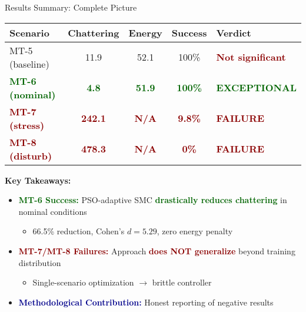 \documentclass[10pt,aspectratio=169]{beamer}
\newcommand{\highlight}[1]{\textcolor{darkblue}{\textbf{#1}}}
\newcommand{\emphred}[1]{\textcolor{darkred}{\textbf{#1}}}
\newcommand{\emphgreen}[1]{\textcolor{darkgreen}{\textbf{#1}}}
\begin{document}
\begin{frame}{Results Summary: Complete Picture}
\begin{table}
\centering
\small
\begin{tabular}{lcccl}
\toprule
\textbf{Scenario} & \textbf{Chattering} & \textbf{Energy} & \textbf{Success} & \textbf{Verdict} \\
\midrule
MT-5 (baseline) & 11.9 & 52.1 & 100\% & \emphred{Not significant} \\
\emphgreen{MT-6 (nominal)} & \emphgreen{4.8} & \emphgreen{51.9} & \emphgreen{100\%} & \emphgreen{EXCEPTIONAL} \\
\emphred{MT-7 (stress)} & \emphred{242.1} & \emphred{N/A} & \emphred{9.8\%} & \emphred{FAILURE} \\
\emphred{MT-8 (disturb)} & \emphred{478.3} & \emphred{N/A} & \emphred{0\%} & \emphred{FAILURE} \\
\bottomrule
\end{tabular}
\end{table}

\vspace{0.5cm}
\textbf{Key Takeaways:}
\begin{itemize}
    \item \emphgreen{MT-6 Success:} PSO-adaptive SMC \emphgreen{drastically reduces chattering} in nominal conditions
    \begin{itemize}
        \item 66.5\% reduction, Cohen's $d = 5.29$, zero energy penalty
    \end{itemize}
    \item \emphred{MT-7/MT-8 Failures:} Approach \emphred{does NOT generalize} beyond training distribution
    \begin{itemize}
        \item Single-scenario optimization $\rightarrow$ brittle controller
    \end{itemize}
    \item \highlight{Methodological Contribution:} Honest reporting of negative results
\end{itemize}

\vspace{0.3cm}
\centering
{}
\end{frame}

\end{document}
